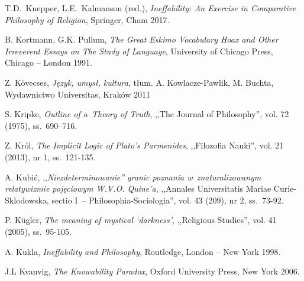 \begin{thebibliography}{100}

T.D.~Knepper, L.E.~Kalmanson (red.), \textit{Ineffability: An Exercise in Comparative Philosophy of Religion}, Springer, Cham 2017.

B. Kortmann, G.K. Pullum, \textit{The Great Eskimo Vocabulary Hoax and Other Irreverent Essays on The Study of Language}, University of Chicago Press, Chicago -- London 1991.

Z. Kövecses, \textit{Język, umysł, kultura}, tłum. A. Kowlacze-Pawlik, M. Buchta, Wydawnictwo Universitas, Kraków 2011


S. Kripke, \textit{Outline of a~Theory of Truth}, ,,The Journal of Philosophy'', vol. 72 (1975), ss.~690–716.

Z. Król, \textit{The Implicit Logic of Plato's Parmenides}, ,,Filozofia Nauki'', vol. 21 (2013), nr 1, ss.~121-135.

A. Kubić, ,,\textit{Niezdeterminowanie'' granic poznania w~znaturalizowanym relatywizmie pojęciowym W.V.O. Quine'a},
,,Annales Universitatis Mariae Curie-Sklodowska, sectio I~-- Philosophia-Sociologia'', vol. 43 (209), nr 2, ss.~73-92.


P. Kügler, \textit{The meaning of mystical ‘darkness'}, ,,Religious Studies'', vol. 41 (2005),  ss.~95-105.

A. Kukla, \textit{Ineffability and Philosophy}, Routledge, London -- New York 1998.

J.L Kvanvig, \textit{The Knowability Paradox}, Oxford University Press, New York 2006.


\end{thebibliography}
